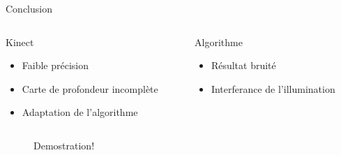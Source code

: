 \documentclass[compress,pdf,11pt,xcolor=dvipsnames]{beamer}
\begin{document}
\begin{frame}{Conclusion}
  
  \begin{columns}
    \begin{column}{0.5\textwidth}
     
      \begin{beamerboxesrounded}[shadow=true]{Kinect}
        \begin{itemize}
        \item Faible précision
        \item Carte de profondeur incomplète
        \item Adaptation de l'algorithme
        \end{itemize}
      \end{beamerboxesrounded}
    \end{column}    
    
    \begin{column}{0.5\textwidth}
      \begin{beamerboxesrounded}[shadow=true]{Algorithme}

        \begin{itemize}
        \item Résultat bruité 
        \item Interferance de l'illumination
        \end{itemize}

      \end{beamerboxesrounded}

    \end{column}    
  \end{columns}    
  
\end{frame}


\begin{frame}{}
  \begin{figure}
    \begin{centering}
      \Huge Demostration!
      \par\end{centering}
  \end{figure}
\end{frame}
\end{document}
